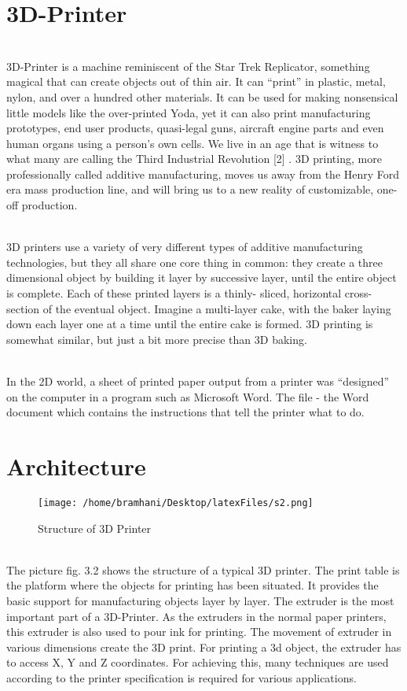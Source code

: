 \documentclass[12pt,a4paper]{report}
\begin{document}
	\chapter{3D-Printer}
	\indent
	\\3D-Printer is a machine reminiscent of the Star Trek Replicator, something magical that can
	create objects out of thin air. It can “print” in plastic, metal, nylon, and over a hundred other
	materials. It can be used for making nonsensical little models like the over-printed Yoda, yet it can
	also print manufacturing prototypes, end user products, quasi-legal guns, aircraft engine parts and
	even human organs using a person’s own cells. We live in an age that is witness to what many are
	calling the Third Industrial Revolution [2] . 3D printing, more professionally called additive
	manufacturing, moves us away from the Henry Ford era mass production line, and will bring us to a
	new reality of customizable, one-off production.\par
	\indent
	\\3D printers use a variety of very different types of additive manufacturing technologies, but
	they all share one core thing in common: they create a three dimensional object by building it layer
	by successive layer, until the entire object is complete. Each of these printed layers is a thinly-
	sliced, horizontal cross-section of the eventual object. Imagine a multi-layer cake, with the baker
	laying down each layer one at a time until the entire cake is formed. 3D printing is somewhat
	similar, but just a bit more precise than 3D baking.\par
	\indent
	\\In the 2D world, a sheet of printed paper output from a printer was “designed” on the
	computer in a program such as Microsoft Word. The file - the Word document which contains the
	instructions that tell the printer what to do.\par

	
	\chapter{Architecture}
	\setlength{\parindent}{10ex} 

	\begin{figure}[H]
		\centering
		\texttt{[image: /home/bramhani/Desktop/latexFiles/s2.png]}
		\label{fig:Structure of 3D Printer}
		\caption{Structure of 3D Printer}
	\end{figure}
	\indent
	\\The picture fig. 3.2 shows the structure of a typical 3D printer. The print table is the platform
	where the objects for printing has been situated. It provides the basic support for manufacturing
	objects layer by layer. The extruder is the most important part of a 3D-Printer. As the extruders in
	the normal paper printers, this extruder is also used to pour ink for printing. The movement of
	extruder in various dimensions create the 3D print. For printing a 3d object, the extruder has to
	access X, Y and Z coordinates. For achieving this, many techniques are used according to the
	printer specification is required for various applications.\par
	
\end{document}
